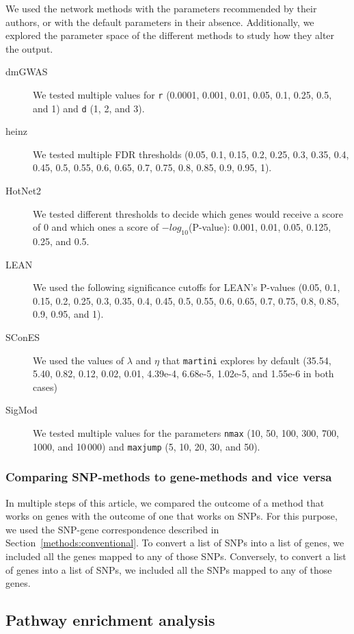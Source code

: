 \documentclass[10pt,letterpaper]{article}
\begin{document}
We used the network methods with the parameters recommended by their authors, or with the default parameters in their absence. Additionally, we explored the parameter space of the different methods to study how they alter the output.

\begin{description}
\item[{dmGWAS}] We tested multiple values for \texttt{r} (0.0001, 0.001, 0.01, 0.05, 0.1, 0.25, 0.5, and 1) and \texttt{d} (1, 2, and 3). 
\item[{heinz}] We tested multiple FDR thresholds (0.05, 0.1, 0.15, 0.2, 0.25, 0.3, 0.35, 0.4, 0.45, 0.5, 0.55, 0.6, 0.65, 0.7, 0.75, 0.8, 0.85, 0.9, 0.95, 1).
\item[{HotNet2}] We tested different thresholds to decide which genes would receive a score of 0 and which ones a score of $-log_{10}$(P-value): 0.001, 0.01, 0.05, 0.125, 0.25, and 0.5.
\item[{LEAN}] We used the following significance cutoffs for LEAN's P-values (0.05, 0.1, 0.15, 0.2, 0.25, 0.3, 0.35, 0.4, 0.45, 0.5, 0.55, 0.6, 0.65, 0.7, 0.75, 0.8, 0.85, 0.9, 0.95, and 1).
\item[{SConES}] We used the values of $\lambda$ and $\eta$ that \texttt{martini} explores by default (35.54, 5.40, 0.82, 0.12, 0.02, 0.01, 4.39e-4, 6.68e-5, 1.02e-5, and 1.55e-6 in both cases)
\item[{SigMod}] We tested multiple values for the parameters \texttt{nmax} (10, 50, 100, 300, 700, 1000, and 10\,000) and \texttt{maxjump} (5, 10, 20, 30, and 50).
\end{description}

\subsubsection{Comparing SNP-methods to gene-methods and vice versa}
\label{methods:snp2gene}

In multiple steps of this article, we compared the outcome of a method that works on genes with the outcome of one that works on SNPs. For this purpose, we used the SNP-gene correspondence described in Section~\ref{methods:conventional}. To convert a list of SNPs into a list of genes, we included all the genes mapped to any of those SNPs. Conversely, to convert a list of genes into a list of SNPs, we included all the SNPs mapped to any of those genes.

\subsection{Pathway enrichment analysis}
\label{methods:pathway_enrichment}
\end{document}
